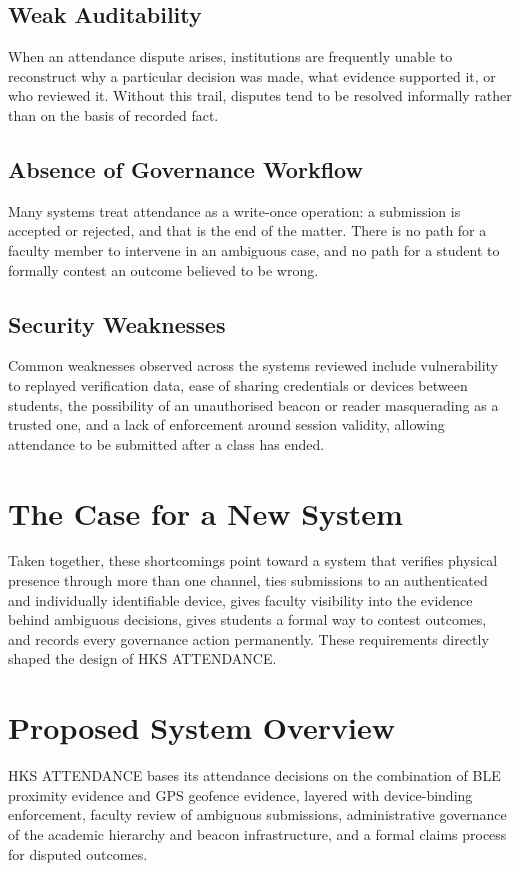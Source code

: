 \documentclass[12pt, a4paper, oneside]{report}
\begin{document}
\subsection{Weak Auditability}
When an attendance dispute arises, institutions are frequently unable to reconstruct why a particular decision was made, what evidence supported it, or who reviewed it. Without this trail, disputes tend to be resolved informally rather than on the basis of recorded fact.

\subsection{Absence of Governance Workflow}
Many systems treat attendance as a write-once operation: a submission is accepted or rejected, and that is the end of the matter. There is no path for a faculty member to intervene in an ambiguous case, and no path for a student to formally contest an outcome believed to be wrong.

\subsection{Security Weaknesses}
Common weaknesses observed across the systems reviewed include vulnerability to replayed verification data, ease of sharing credentials or devices between students, the possibility of an unauthorised beacon or reader masquerading as a trusted one, and a lack of enforcement around session validity, allowing attendance to be submitted after a class has ended.

\section{The Case for a New System}

Taken together, these shortcomings point toward a system that verifies physical presence through more than one channel, ties submissions to an authenticated and individually identifiable device, gives faculty visibility into the evidence behind ambiguous decisions, gives students a formal way to contest outcomes, and records every governance action permanently. These requirements directly shaped the design of HKS ATTENDANCE.

\section{Proposed System Overview}

HKS ATTENDANCE bases its attendance decisions on the combination of BLE proximity evidence and GPS geofence evidence, layered with device-binding enforcement, faculty review of ambiguous submissions, administrative governance of the academic hierarchy and beacon infrastructure, and a formal claims process for disputed outcomes.
\end{document}
